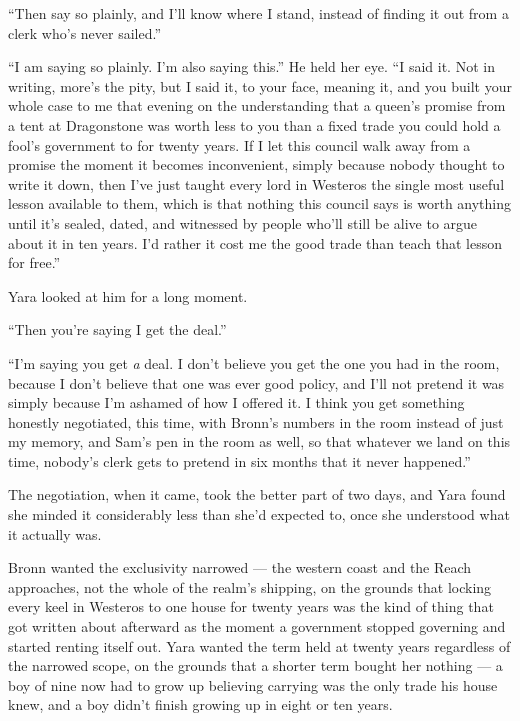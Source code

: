 “Then say so plainly, and I’ll know where I stand, instead of finding it out from a clerk who’s never sailed.”

“I am saying so plainly. I’m also saying this.” He held her eye. “I said it. Not in writing, more’s the pity, but I said it, to your face, meaning it, and you built your whole case to me that evening on the understanding that a queen’s promise from a tent at Dragonstone was worth less to you than a fixed trade you could hold a fool’s government to for twenty years. If I let this council walk away from a promise the moment it becomes inconvenient, simply because nobody thought to write it down, then I’ve just taught every lord in Westeros the single most useful lesson available to them, which is that nothing this council says is worth anything until it’s sealed, dated, and witnessed by people who’ll still be alive to argue about it in ten years. I’d rather it cost me the good trade than teach that lesson for free.”

Yara looked at him for a long moment.

“Then you’re saying I get the deal.”

“I’m saying you get \textit{a} deal. I don’t believe you get the one you had in the room, because I don’t believe that one was ever good policy, and I’ll not pretend it was simply because I’m ashamed of how I offered it. I think you get something honestly negotiated, this time, with Bronn’s numbers in the room instead of just my memory, and Sam’s pen in the room as well, so that whatever we land on this time, nobody’s clerk gets to pretend in six months that it never happened.”

\sceneBreak

The negotiation, when it came, took the better part of two days, and Yara found she minded it considerably less than she’d expected to, once she understood what it actually was.

Bronn wanted the exclusivity narrowed — the western coast and the Reach approaches, not the whole of the realm’s shipping, on the grounds that locking every keel in Westeros to one house for twenty years was the kind of thing that got written about afterward as the moment a government stopped governing and started renting itself out. Yara wanted the term held at twenty years regardless of the narrowed scope, on the grounds that a shorter term bought her nothing — a boy of nine now had to grow up believing carrying was the only trade his house knew, and a boy didn’t finish growing up in eight or ten years.

